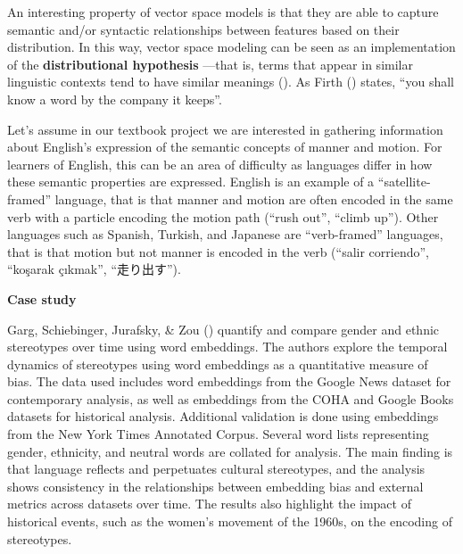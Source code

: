\documentclass[
  letterpaper,
  krantz1]{latex/krantz-mod}
\theoremstyle{definition}
\theoremstyle{definition}
\theoremstyle{remark}
\begin{document}
An interesting property of vector space models is that they are able to
capture semantic and/or syntactic relationships between features based
on their distribution. In this way, vector space modeling can be seen as
an implementation of the \textbf{distributional
hypothesis} ---that is, terms that
appear in similar linguistic contexts tend to have similar meanings
(). As Firth
() states, ``you shall know a word by the
company it keeps''.

Let's assume in our textbook project we are interested in gathering
information about English's expression of the semantic concepts of
manner and motion. For learners of English, this can be an area of
difficulty as languages differ in how these semantic properties are
expressed. English is an example of a ``satellite-framed'' language,
that is that manner and motion are often encoded in the same verb with a
particle encoding the motion path (``rush out'', ``climb up''). Other
languages such as Spanish, Turkish, and Japanese are ``verb-framed''
languages, that is that motion but not manner is encoded in the verb
(``salir corriendo'', ``koşarak çıkmak'', ``走り出す'').

\begin{tcolorbox}[enhanced jigsaw, toprule=.15mm, breakable, colback=white, arc=.35mm, left=2mm, colframe=quarto-callout-color-frame, opacityback=0, bottomrule=.15mm, rightrule=.15mm, leftrule=.75mm]

\textbf{ Case study}

Garg, Schiebinger, Jurafsky, \& Zou ()
quantify and compare gender and ethnic stereotypes over time using word
embeddings. The authors explore the temporal dynamics of stereotypes
using word embeddings as a quantitative measure of bias. The data used
includes word embeddings from the Google News dataset for contemporary
analysis, as well as embeddings from the COHA and Google Books datasets
for historical analysis. Additional validation is done using embeddings
from the New York Times Annotated Corpus. Several word lists
representing gender, ethnicity, and neutral words are collated for
analysis. The main finding is that language reflects and perpetuates
cultural stereotypes, and the analysis shows consistency in the
relationships between embedding bias and external metrics across
datasets over time. The results also highlight the impact of historical
events, such as the women's movement of the 1960s, on the encoding of
stereotypes.

\end{tcolorbox}
\end{document}
